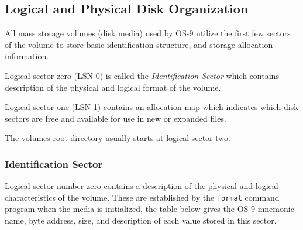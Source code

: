 \documentclass[
]{article}
\begin{document}
\subsection{Logical and Physical Disk Organization}

All mass storage volumes (disk media) used by OS-9 utilize the first few
sectors of the volume to store basic identification structure, and
storage allocation information.

Logical sector zero (LSN 0) is called the \emph{Identification Sector}
which contains description of the physical and logical format of the
volume.

Logical sector one (LSN 1) contains an allocation map which indicates
which disk sectors are free and available for use in new or expanded
files.

The volume\textquotesingle s root directory usually starts at logical
sector two.

\subsubsection{Identification Sector}\label{ident-sector}

Logical sector number zero contains a description of the physical and
logical characteristics of the volume. These are established by the
\texttt{format} command program when the media is initialized, the table
below gives the OS-9 mnemonic name, byte address, size, and description
of each value stored in this sector.
\end{document}
